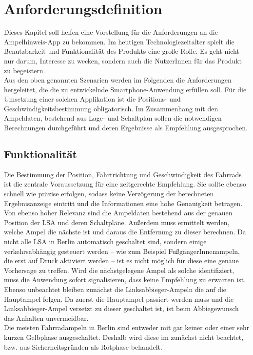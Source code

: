 \chapter{\label{chap:anforderungen}Anforderungsdefinition}
Dieses Kapitel soll helfen eine Vorstellung für die Anforderungen an die Ampelhinweis-\gls{App} zu bekommen. Im heutigen Technologiezeitalter spielt die Benutzbarkeit und Funktionalität des Produkts eine große Rolle. Es geht nicht nur darum, Interesse zu wecken, sondern auch die NutzerInnen für das Produkt zu begeistern. \\
Aus den oben genannten Szenarien werden im Folgenden die Anforderungen hergeleitet, die die zu entwickelnde \gls{Smartphone}-Anwendung erfüllen soll. Für die Umsetzung einer solchen Applikation ist die Positions- und Geschwindigkeitsbestimmung obligatorisch. Im Zusammenhang mit den Ampeldaten, bestehend aus Lage- und Schaltplan sollen die notwendigen Berechnungen durchgeführt und deren Ergebnisse als Empfehlung ausgesprochen.
\section{Funktionalität}
Die Bestimmung der Position, Fahrtrichtung und Geschwindigkeit des Fahrrads ist die zentrale Voraussetzung für eine zeitgerechte Empfehlung. Sie sollte ebenso schnell wie präzise erfolgen, sodass keine Verzögerung der berechneten Ergebnisanzeige eintritt und die Informationen eine hohe Genauigkeit betragen.\\
Von ebenso hoher Relevanz sind die Ampeldaten bestehend aus der genauen Position der \gls{LSA} und deren Schaltpläne. Außerdem muss ermittelt werden, welche Ampel die nächste ist und daraus die Entfernung zu dieser berechnen. Da nicht alle \gls{LSA} in Berlin automatisch geschaltet sind, sondern einige verkehrsabhängig gesteuert werden -- wie zum Beispiel FußgängerInnenampeln, die erst auf Druck aktiviert werden -- ist es nicht möglich für diese eine genaue Vorhersage zu treffen. Wird die nächstgelegene Ampel als solche identifiziert, muss die Anwendung sofort signalisieren, dass keine Empfehlung zu erwarten ist. Ebenso unbeachtet bleiben zunächst die Linksabbieger-Ampeln die auf die Hauptampel folgen. Da zuerst die Hauptampel passiert werden muss und die Linksabbieger-Ampel versetzt zu dieser geschaltet ist, ist beim Abbiegewunsch das Anhalten unvermeidbar.\\
Die meisten Fahrradampeln in Berlin sind entweder mit gar keiner oder einer sehr kurzen Gelbphase ausgeschaltet. Deshalb wird diese im zunächst nicht beachtet, bzw. aus Sicherheitsgründen als Rotphase behandelt.
